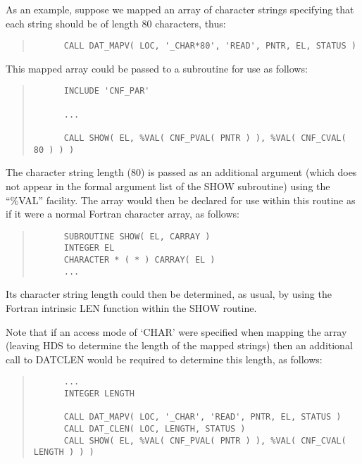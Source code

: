 \documentclass[twoside,11pt]{article}
\newcommand{\htmlref}[2]{#1}
\renewcommand{\_}{\texttt{\symbol{95}}}
\newcommand{\qt}[1]{``#1''}
\newcommand{\qt}[1]{{\tt{"}}#1{\tt{"}}}
\begin{document}
As an example, suppose we mapped an array of character strings
specifying that each string should be of length 80 characters, thus:

\small
\begin{quote}
\begin{verbatim}
      CALL DAT_MAPV( LOC, '_CHAR*80', 'READ', PNTR, EL, STATUS )
\end{verbatim}
\end{quote}
\normalsize

This mapped array could be passed to a subroutine for use as follows:

\small
\begin{quote}
\begin{verbatim}
      INCLUDE 'CNF_PAR'

      ...

      CALL SHOW( EL, %VAL( CNF_PVAL( PNTR ) ), %VAL( CNF_CVAL( 80 ) ) )
\end{verbatim}
\end{quote}
\normalsize

The character string length (80) is passed as an additional argument
(which does not appear in the formal argument list of the SHOW
subroutine) using the \qt{\%VAL} facility. The array would then be
declared for use within this routine as if it were a normal Fortran
character array, as follows:

\small
\begin{quote}
\begin{verbatim}
      SUBROUTINE SHOW( EL, CARRAY )
      INTEGER EL
      CHARACTER * ( * ) CARRAY( EL )
      ...
\end{verbatim}
\end{quote}
\normalsize

Its character string length could then be determined, as usual, by
using the Fortran intrinsic LEN function within the SHOW routine.

Note that if an access mode of `\_CHAR' were specified when mapping
the array (leaving HDS to determine the length of the mapped strings)
then an additional call to \htmlref{DAT\_CLEN}{DAT_CLEN} would be
required to determine this length, as follows:

\small
\begin{quote}
\begin{verbatim}
      ...
      INTEGER LENGTH

      CALL DAT_MAPV( LOC, '_CHAR', 'READ', PNTR, EL, STATUS )
      CALL DAT_CLEN( LOC, LENGTH, STATUS )
      CALL SHOW( EL, %VAL( CNF_PVAL( PNTR ) ), %VAL( CNF_CVAL( LENGTH ) ) )
\end{verbatim}
\end{quote}
\normalsize
\end{document}
